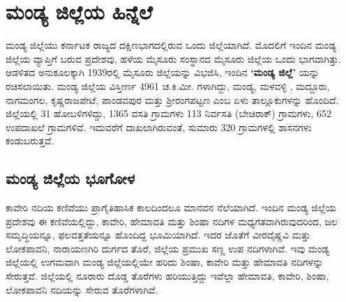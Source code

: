 
\chapter{ಮಂಡ್ಯ ಜಿಲ್ಲೆಯ ಹಿನ್ನೆಲೆ}

 ಮಂಡ್ಯ ಜಿಲ್ಲೆಯು ಕರ್ನಾಟಕ ರಾಜ್ಯದ ದಕ್ಷಿಣಭಾಗದಲ್ಲಿರುವ ಒಂದು ಜಿಲ್ಲೆಯಾಗಿದೆ. ಮೊದಲಿಗೆ ಇಂದಿನ ಮಂಡ್ಯ ಜಿಲ್ಲೆಯ ವ್ಯಾಪ್ತಿಗೆ ಬರುವ ಪ್ರದೇಶವು, ಹಳೆಯ ಮೈಸೂರು ಸಂಸ್ಥಾನದ ಮೈಸೂರು ಜಿಲ್ಲೆಯ ಒಂದು ಭಾಗವಾಗಿತ್ತು. ಆಡಳಿತದ ಅನುಕೂಲಕ್ಕಾಗಿ 1939ರಲ್ಲಿ ಮೈಸೂರು ಜಿಲ್ಲೆಯನ್ನು ವಿಭಜಿಸಿ, ಇಂದಿನ \textbf{‘ಮಂಡ್ಯ ಜಿಲ್ಲೆ’ }ಯನ್ನು ರಚಿಸಲಾಯಿತು. ಮಂಡ್ಯ ಜಿಲ್ಲೆಯ ವಿಸ್ತೀರ್ಣ 4961 ಚ.ಕಿ.ಮೀ. ಗಳಾಗಿದ್ದು, ಮಂಡ್ಯ, ಮಳವಳ್ಳಿ , ಮದ್ದೂರು, ನಾಗಮಂಗಲ, ಕೃಷ್ಣರಾಜಪೇಟೆ, ಪಾಂಡವಪುರ ಮತ್ತು ಶ‍್ರೀರಂಗಪಟ್ಟಣ ಎಂಬ ಏಳು ತಾಲ್ಲೂಕುಗಳನ್ನು ಹೊಂದಿದೆ. ಜಿಲ್ಲೆಯಲ್ಲಿ 31 ಹೋಬಳಿಗಳಿದ್ದು, 1365 ವಸತಿ ಗ್ರಾಮಗಳು 113 ನಿರ್ವಸತಿ (ಬೇಚಿರಾಕ್) ಗ್ರಾಮಗಳು, 652 ಉಪದಾಖಲೆ ಗ್ರಾಮಗಳಿವೆ. ಇದುವರೆಗೆ ದಾಖಲಾಗಿರುವಂತೆ, ಸುಮಾರು 320 ಗ್ರಾಮಗಳಲ್ಲಿ ಶಾಸನಗಳು ಕಂಡುಬರುತ್ತವೆ.

\section*{ಮಂಡ್ಯ ಜಿಲ್ಲೆಯ ಭೂಗೋಳ}

ಕಾವೇರಿ ನದಿಯ ಕಣಿವೆಯು ಪ್ರಾಗೈತಿಹಾಸಿಕ ಕಾಲದಿಂದಲೂ ಮಾನವನ ನೆಲೆಯಾಗಿದೆ. ಇಂದಿನ ಮಂಡ್ಯ ಜಿಲ್ಲೆಯ ಪ್ರದೇಶವು ಈ ಕಣಿವೆಯಲ್ಲಿದ್ದು, ಕಾವೇರಿ, ಹೇಮಾವತಿ ಮತ್ತು ಶಿಂಷಾ ನದಿಗಳ ಮಧ್ಯಗತವಾಗಿರುವುದರಿಂದ, ಜಲ ಸಮೃದ್ಧಿಯನ್ನೂ, ಫಲವತ್ತತೆಯನ್ನೂ ಹೊಂದಿದ್ದ ಭೂಮಿಯಾಗಿದೆ. ಇದರ ಜೊತೆಗೆ ವೀರವೈಷ್ಣವಿ ಮತ್ತು ಲೋಕಪಾವನಿ, ನಾರಾಯಣಗಿರಿ ದುರ್ಗದ ತೊರೆ, ಜಿಲ್ಲೆಯ ಪ್ರಮುಖ ಸಣ್ಣ ಉಪ ನದಿಗಳಾಗಿವೆ. ಇವು ಮಂಡ್ಯ ಜಿಲ್ಲೆಯಲ್ಲಿ ಉಗಮವಾಗಿ ಮಂಡ್ಯ ಜಿಲ್ಲೆಯಲ್ಲಿಯೇ ಹರಿದು ಶಿಂಷಾ, ಕಾವೇರಿ ಮತ್ತು ಹೇಮಾವತಿ ನದಿಗಳನ್ನು ಸೇರುತ್ತವೆ. ಜಿಲ್ಲೆಯಲ್ಲಿ ನೂರಾರು ದೊಡ್ಡ ತೊರೆಗಳು ಹರಿಯುತ್ತಿದ್ದು ಇವೆಲ್ಲಾ ಹೇಮಾವತಿ, ಕಾವೇರಿ, ಶಿಂಷಾ, ಲೋಕಪಾವನಿ ನದಿಯನ್ನು ಸೇರುವ ತೊರೆಗಳಾಗಿವೆ.

